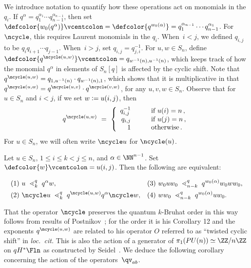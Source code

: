 We introduce notation to quantify how these operations act on monomials in the~$q_i$.
If $q^\alpha=q_1^{\alpha_1}\dotsb q_{n-1}^{\alpha_{n-1}}$, then set
$\defcolor{w_0(q^\alpha)}\vcentcolon=\defcolor{q^{w_0(\alpha)}}=q_1^{\alpha_{n-1}}\dotsb q_{n-1}^{\alpha_{1}}$.
For $\ncycle$, this requires Laurent monomials in the $q_i$.
When~$i<j$, we defined $q_{i,j}$ to be $q_iq_{i+1}\dotsb q_{j-1}$.
When~$i>j$, set $q_{i,j}=q_{j,i}^{-1}$.
For $u,w\in S_n$, define $\defcolor{q^{\ncycle(u,w)}}\vcentcolon=q_{w^{-1}(n),u^{-1}(n)}$, which keeps track of how the monomial $q^\alpha$
in elements of $S_n[q]$ is affected by the cyclic shift.
Note that $q^{\ncycle(u,w)}=q_{1,u^{-1}(n)}\cdot q_{w^{-1}(n),1}$, which shows that it is multiplicative in that
$q^{\ncycle(u,w)}=q^{\ncycle(u,v)}\cdot q^{\ncycle(v,w)}$, for any $u,v,w\in S_n$.
Observe that for $u\in S_n$ and $i<j$, if we set $w\vcentcolon= u(i,j)$, then 
\begin{equation}\label{Eq:qOcycle}
   q^{\ncycle(u,w)}\ =\ \left\{ \begin{array}{rcl} 
      q_{i,j}^{-1} &\quad&\mbox{if } u(i)=n\,,\\
      q_{i,j} &\quad&\mbox{if } u(j)=n\,,\\
      1 &\quad&\mbox{otherwise}\,. \end{array}\right.
\end{equation}
For $u\in S_n$, we will often write $\ncycle u$ for $\ncycle(u)$.


\begin{lemma}\label{L:symmetry_qkBO}
  Let $u\in S_n$, $1\leq i\leq k<j\leq n$, and $\alpha\in\NN^{n-1}$.
  Set $\defcolor{w}\vcentcolon= u(i,j)$.
  Then the following are equivalent:
  
  \begin{align*}
    & (1)\ u\ \lessdot_k^q\ q^\alpha w, 
    & &(3)\ w_0uw_0\ \lessdot_{n-k}^q\ q^{w_0(\alpha)} w_0 w w_0, \\
    & (2)\ \ncycle u\ \lessdot_k^q\ q^{\ncycle(u,w)} q^\alpha \ncycle w, 
    & &(4)\ w w_0\ \lessdot_{n-k}^q\ q^{w_0(\alpha)} u w_0.
 \end{align*}
 
\end{lemma}

That the operator $\ncycle$ preserves the quantum $k$-Bruhat order in this way follows from results of Postnikov~\cite{Postnikov_symmetry};
for the order it is his Corollary 12 and the exponents  $q^{\ncycle(u,w)}$ are related to his operator $O$ referred to as ``twisted cyclic
shift'' in {\it loc.\ cit.}
This is also the action of a generator of $\pi_1(PU(n))\simeq\ZZ/n\ZZ$ on $qH^*\Fln$ as constructed by Seidel~\cite{Seidel}.
We deduce the following corollary concerning the action of the operators~$\qv_{ab}$.

